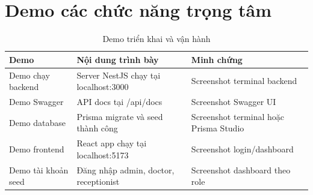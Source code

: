 \section{Demo các chức năng trọng tâm}

\begin{longtable}{|p{3.2cm}|p{5.2cm}|p{5.5cm}|}
\caption{Demo triển khai và vận hành}\\
\hline
\textbf{Demo} & \textbf{Nội dung trình bày} & \textbf{Minh chứng } \\
\hline
Demo chạy backend & Server NestJS chạy tại localhost:3000 & Screenshot terminal backend \\
\hline
Demo Swagger & API docs tại /api/docs & Screenshot Swagger UI \\
\hline
Demo database & Prisma migrate và seed thành công & Screenshot terminal hoặc Prisma Studio \\
\hline
Demo frontend & React app chạy tại localhost:5173 & Screenshot login/dashboard \\
\hline
Demo tài khoản seed & Đăng nhập admin, doctor, receptionist & Screenshot dashboard theo role \\
\hline
\end{longtable}
